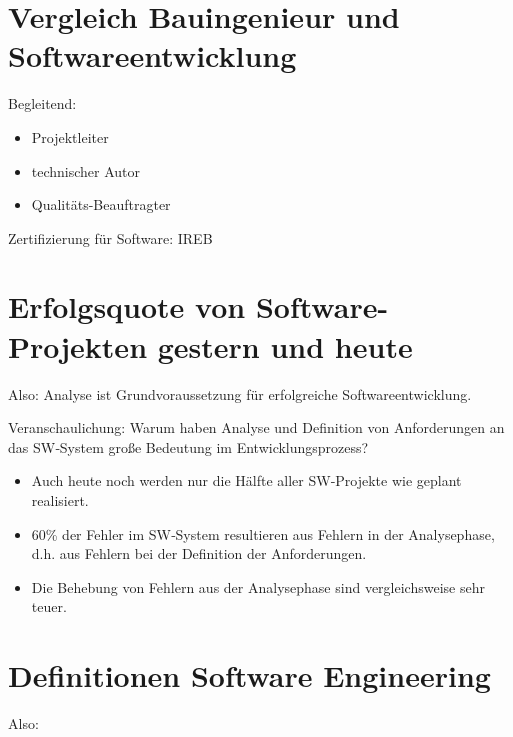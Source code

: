 \section{Vergleich Bauingenieur und Softwareentwicklung}
Begleitend:
\begin{itemize}
\item Projektleiter
\item technischer Autor
\item Qualitäts-Beauftragter
\end{itemize}
Zertifizierung für Software: IREB

\section{Erfolgsquote von Software-Projekten gestern und heute}
Also: Analyse ist Grundvoraussetzung für erfolgreiche Softwareentwicklung.

Veranschaulichung:
Warum haben Analyse und Definition von Anforderungen an das SW‐System große Bedeutung
im Entwicklungsprozess?
\begin{itemize}
\item Auch heute noch werden nur die Hälfte aller SW‐Projekte wie geplant realisiert.
\item 60\% der Fehler im SW‐System resultieren aus Fehlern in der Analysephase, d.h. aus Fehlern bei der Definition der Anforderungen.
\item Die Behebung von Fehlern aus der Analysephase sind vergleichsweise sehr teuer.
\end{itemize}

\section{Definitionen Software Engineering}

Also:


